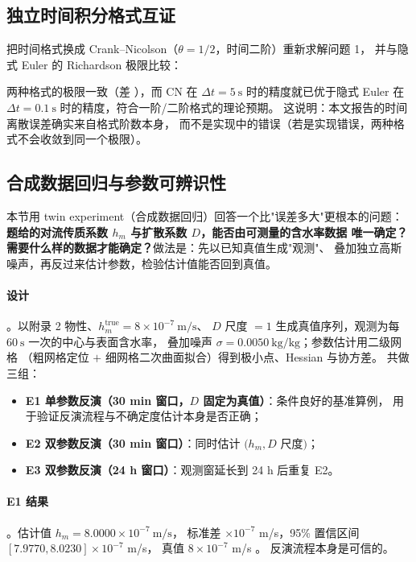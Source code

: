 \subsection{独立时间积分格式互证}

把时间格式换成 Crank--Nicolson（$\theta=1/2$，时间二阶）重新求解问题 1，
并与隐式 Euler 的 Richardson 极限比较：



两种格式的极限一致（差 ），而 CN 在
$\Delta t=5\ \mathrm{s}$ 时的精度就已优于隐式 Euler 在
$\Delta t=0.1\ \mathrm{s}$ 时的精度，符合一阶/二阶格式的理论预期。
这说明：本文报告的时间离散误差确实来自格式阶数本身，
而不是实现中的错误（若是实现错误，两种格式不会收敛到同一个极限）。

\subsection{合成数据回归与参数可辨识性}

本节用 twin experiment（合成数据回归）回答一个比"误差多大"更根本的问题：
\textbf{题给的对流传质系数 $h_m$ 与扩散系数 $D$，能否由可测量的含水率数据
唯一确定？需要什么样的数据才能确定？}做法是：先以已知真值生成"观测"、
叠加独立高斯噪声，再反过来估计参数，检验估计值能否回到真值。

\paragraph{设计}。以附录 2 物性、$h_m^{\text{true}}=8\times10^{-7}\ \mathrm{m/s}$、
$D$ 尺度 $=1$ 生成真值序列，观测为每 $60\ \mathrm{s}$ 一次的中心与表面含水率，
叠加噪声 $\sigma=\text{0.0050}\ \mathrm{kg/kg}$；参数估计用二级网格
（粗网格定位 $+$ 细网格二次曲面拟合）得到极小点、Hessian 与协方差。
共做三组：

\begin{itemize}[leftmargin=2.2em,itemsep=0.25em]
  \item \textbf{E1 单参数反演（30 min 窗口，$D$ 固定为真值）}：条件良好的基准算例，
        用于验证反演流程与不确定度估计本身是否正确；
  \item \textbf{E2 双参数反演（30 min 窗口）}：同时估计 $(h_m, D$ 尺度$)$；
  \item \textbf{E3 双参数反演（24 h 窗口）}：观测窗延长到 24 h 后重复 E2。
\end{itemize}

\paragraph{E1 结果}。估计值 $h_m=\text{8.0000}\times10^{-7}\ \mathrm{m/s}$，
标准差 $\times10^{-7}$ m/s，95\% 置信区间
$[\text{7.9770},\text{8.0230}]\times10^{-7}$ m/s，
真值 $8\times10^{-7}$ m/s 。
反演流程本身是可信的。

